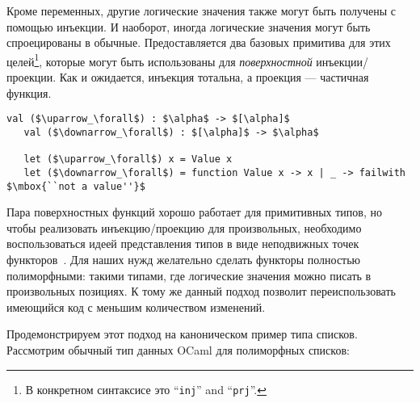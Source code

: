 Кроме переменных, другие логические значения также могут быть получены с помощью инъекции.
И наоборот, иногда логические значения могут быть спроецированы в обычные.
Предоставляется два базовых примитива для этих целей\footnote{В конкретном синтаксисе это \enquote{\lstinline|inj|} and \enquote{\lstinline|prj|}.},
которые могут быть использованы для \emph{поверхностной} инъекции/проекции. Как и ожидается, инъекция тотальна, а проекция --- частичная функция.


\begin{lstlisting}[mathescape=true]
   val ($\uparrow_\forall$) : $\alpha$ -> $[\alpha]$
   val ($\downarrow_\forall$) : $[\alpha]$ -> $\alpha$

   let ($\uparrow_\forall$) x = Value x
   let ($\downarrow_\forall$) = function Value x -> x | _ -> failwith $\mbox{``not a value''}$
\end{lstlisting}


Пара поверхностных функций хорошо работает для примитивных типов, но чтобы реализовать инъекцию/проекцию для произвольных, необходимо воспользоваться
идеей представления типов в виде неподвижных точек функторов~\cite{ALaCarte}.
Для наших нужд желательно сделать функторы полностью полиморфными: такими типами, где логические значения можно писать в произвольных позициях.
К тому же данный подход позволит переиспользовать имеющийся код с меньшим количеством изменений.


Продемонстрируем этот подход на каноническом пример типа списков. Рассмотрим обычный тип данных OCaml для полиморфных списков:

